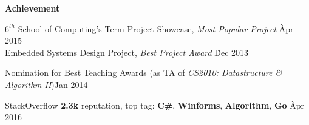 \documentclass{article}
\begin{document}
\centerline {\Large \bf Achievement}

\medskip

\begin{tabbing}
\hspace{12pt} \textbullet \hspace{3pt} {$6^{th}$} School of Computing's Term Project Showcase, {\it Most Popular Project} \` Apr 2015 \\
\hspace{12pt} \textbullet \hspace{3pt} Embedded Systems Design Project, {\it Best Project Award} \` Dec 2013 \\
\end{tabbing}\vspace{-18pt}

\begin{tabbing}
\hspace{12pt} \textbullet \hspace{3pt} Nomination for Best Teaching Awards (as TA of {\it CS2010: Datastructure \& Algorithm II})\` Jan 2014 \\
\end{tabbing}\vspace{-18pt}

\begin{tabbing}
\hspace{12pt} \textbullet \hspace{3pt} StackOverflow {\bf 2.3k} reputation, top tag: {\bf C\#}, {\bf Winforms}, {\bf Algorithm}, {\bf Go} \` Apr 2016 \\
\end{tabbing}\vspace{-18pt}
\end{document}
